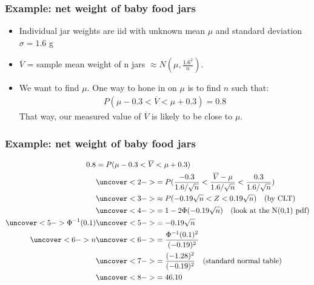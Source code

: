 \documentclass[handout]{beamer}\usepackage{graphicx, color}
\providecommand{\nv}{{}^{-1}}
\providecommand{\ov}[1]{\overline{#1}}
\numberwithin{equation}{section}
\begin{document}
\begin{frame}
\frametitle{Example: net weight of baby food jars}
\begin{itemize}
\item Individual jar weights are iid with unknown mean $\mu$ and standard deviation $\sigma = 1.6$ g 
\pause \item $\ov{V}$ = sample mean weight of n jars $\approx N \left (\mu, \frac{1.6^2}{n} \right )$.
\pause \item We want to find $\mu$. One way to hone in on $\mu$ is to find $n$ such that:
\pause \begin{align*}
P(\mu - 0.3 < \ov{V} < \mu + 0.3) = 0.8
\end{align*}
\pause That way, our measured value of $\ov{V}$ is likely to be close to $\mu$. 
\end{itemize}
\end{frame}

\begin{frame}
\frametitle{Example: net weight of baby food jars} \small
\begin{align*}
0.8 &= P(\mu - 0.3 < \ov{V} < \mu + 0.3) \\
&\uncover<2->{= P(\frac{-0.3}{1.6/\sqrt{n}} < \frac{\ov{V} - \mu}{1.6/\sqrt{n}} < \frac{0.3}{1.6/\sqrt{n}} )} \\
&\uncover<3->{\approx P(-0.19 \sqrt{n} < Z < 0.19 \sqrt{n} ) \quad \text{(by CLT)} }\\
&\uncover<4->{= 1 - 2\Phi(-0.19 \sqrt{n}) \quad \text{(look at the N(0,1) pdf)}} \\
\uncover<5->{\Phi \nv (0.1)} & \uncover<5->{= -0.19 \sqrt{n} }\\
\uncover<6->{n} & \uncover<6->{= \frac{\Phi \nv (0.1)^2}{(-0.19)^2}} \\
&\uncover<7->{= \frac{(-1.28)^2}{(-0.19)^2} \quad \text{(standard normal table)}} \\
&\uncover<8->{= 46.10}
\end{align*}
\begin{itemize}
\end{itemize}
\end{frame}
\end{document}
